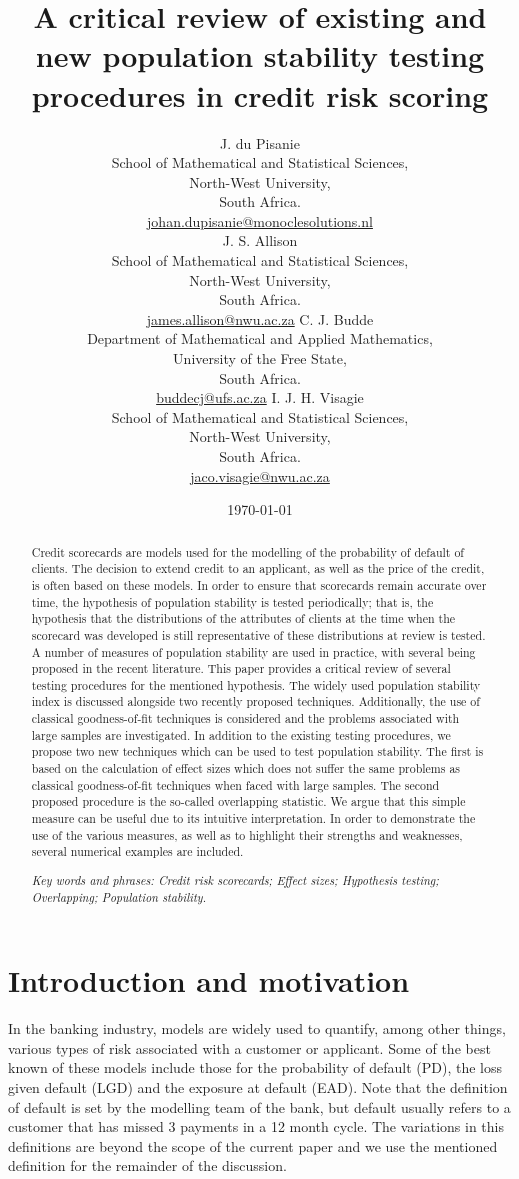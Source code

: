 \documentclass{article}
\title{A critical review of existing and new population stability testing procedures in credit risk scoring}
\author{J. du Pisanie\\
School of Mathematical and Statistical Sciences,\\ North-West University,\\ South Africa. \\
\href{mailto:dupisanie@gmail.com}{johan.dupisanie@monoclesolutions.nl}\\
\And J. S. Allison\\
School of Mathematical and Statistical Sciences,\\ North-West University,\\ South Africa.\\
\href{mailto:james.allison@nwu.ac.za}{james.allison@nwu.ac.za}
\And C. J. Budde\\
Department of Mathematical and Applied Mathematics,\\ University of the Free State,\\ South Africa.\\
\href{mailto:buddecj@ufs.ac.za}{buddecj@ufs.ac.za}
\And I. J. H. Visagie\\
School of Mathematical and Statistical Sciences,\\ North-West University,\\ South Africa.\\
\href{mailto:jaco.visagie@nwu.ac.za}{jaco.visagie@nwu.ac.za}\\
}
\theoremstyle{def}
\begin{document}
\date{\today}
\maketitle

\begin{abstract}
    Credit scorecards are models used for the modelling of the probability of default of clients. The decision to extend credit to an applicant, as well as the price of the credit, is often based on these models. In order to ensure that scorecards remain accurate over time, the hypothesis of population stability is tested periodically; that is, the hypothesis that the distributions of the attributes of clients at the time when the scorecard was developed is still representative of these distributions at review is tested. A number of measures of population stability are used in practice, with several being proposed in the recent literature. This paper provides a critical review of several testing procedures for the mentioned hypothesis. The widely used population stability index is discussed alongside two recently proposed techniques. Additionally, the use of classical goodness-of-fit techniques is considered and the problems associated with large samples are investigated. In addition to the existing testing procedures, we propose two new techniques which can be used to test population stability. The first is based on the calculation of effect sizes which does not suffer the same problems as classical goodness-of-fit techniques when faced with large samples. The second proposed procedure is the so-called overlapping statistic. We argue that this simple measure can be useful due to its intuitive interpretation. In order to demonstrate the use of the various measures, as well as to highlight their strengths and weaknesses, several numerical examples are included.
\vspace{0.5cm}


\emph{Key words and phrases: Credit risk scorecards; Effect sizes; Hypothesis testing; Overlapping; Population stability.}

\end{abstract}

\section{Introduction and motivation}
\label{Intro}

In the banking industry, models are widely used to quantify, among other things, various types of risk associated with a customer or applicant. Some of the best known of these models include those for the probability of default (PD), the loss given default (LGD) and the exposure at default (EAD). Note that the definition of default is set by the modelling team of the bank, but default usually refers to a customer that has missed 3 payments in a 12 month cycle. The variations in this definitions are beyond the scope of the current paper and we use the mentioned definition for the remainder of the discussion.
\end{document}
